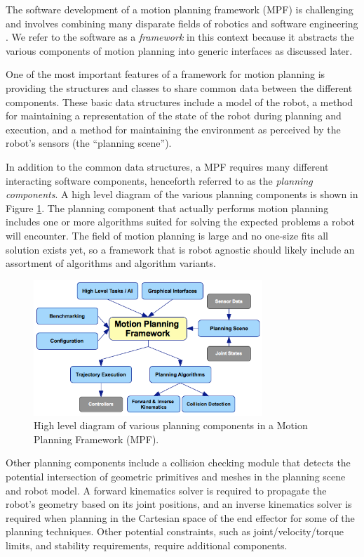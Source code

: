 \documentclass[10pt,journal,compsoc]{joser1}
\begin{document}
{The software development of a motion planning framework (MPF) is challenging and involves combining many disparate fields of robotics and software engineering \cite{perez2010roadmap}. We refer to the software as a \textit{framework} in this context because it abstracts the various components of motion planning into generic interfaces as discussed later.

One of the most important features of a framework for motion planning is providing the structures and classes to share common data between the different components. These basic data structures include a model of the robot, a method for maintaining a representation of the state of the robot during planning and execution, and a method for maintaining the environment as perceived by the robot's sensors (the ``planning scene'').

In addition to the common data structures, a MPF requires many different interacting software components, henceforth referred to as the \textit{planning components}. A high level diagram of the various planning components is shown in Figure \ref{fig:motionplanning_highlevel}. The planning component that actually performs motion planning includes one or more algorithms suited for solving the expected problems a robot will encounter. The field of motion planning is large and no one-size fits all solution exists yet, so a framework that is robot agnostic should likely include an assortment of algorithms and algorithm variants.

\begin{figure}[!t]
\centering
\includegraphics[width=3.4in]{images/motionplanning_highlevel}
\caption{High level diagram of various planning components in a Motion Planning Framework (MPF).}
\label{fig:motionplanning_highlevel}
\end{figure} 

Other planning components include a collision checking module that detects the potential intersection of geometric primitives and meshes in the planning scene and robot model. A forward kinematics solver is required to propagate the robot's geometry based on its joint positions, and an inverse kinematics solver is required when planning in the Cartesian space of the end effector for some of the planning techniques. Other potential constraints, such as joint/velocity/torque limits, and stability requirements, require additional components.

}
\end{document}
